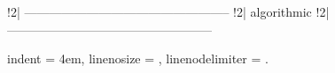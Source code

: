 !2| --------------------------------------------------
!2| {algorithmic}
!2| --------------------------------------------------

\usepackage{algorithmic}

\algsetup
{
	indent = 4em,
	linenosize = \small,
	linenodelimiter = .
}

\renewcommand{\algorithmicrequire}{\textbf{Input:}}

\renewcommand{\algorithmicensure}{\textbf{Output:}}
